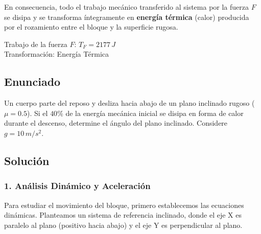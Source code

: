 \documentclass[12pt, a4paper]{article}
\begin{document}
En consecuencia, todo el trabajo mecánico transferido al sistema por la fuerza $F$ se disipa y se transforma íntegramente en \textbf{energía térmica} (calor) producida por el rozamiento entre el bloque y la superficie rugosa.

\begin{tcolorbox}[colback=green!5!white, colframe=green!50!black, title=Respuesta Final]
\centering
Trabajo de la fuerza $F$: $T_F = 2177 \, \si{J}$ \\
Transformación: Energía Térmica
\end{tcolorbox}

\newpage

\subsection*{Enunciado}
Un cuerpo parte del reposo y desliza hacia abajo de un plano inclinado rugoso ($\mu = 0.5$). Si el $40\%$ de la energía mecánica inicial se disipa en forma de calor durante el descenso, determine el ángulo del plano inclinado. Considere $g = 10 \, \si{m/s^2}$.

\begin{center}
\end{center}

\subsection*{Solución}

\subsubsection*{1. Análisis Dinámico y Aceleración}
Para estudiar el movimiento del bloque, primero establecemos las ecuaciones dinámicas. Planteamos un sistema de referencia inclinado, donde el eje X es paralelo al plano (positivo hacia abajo) y el eje Y es perpendicular al plano.
\end{document}
